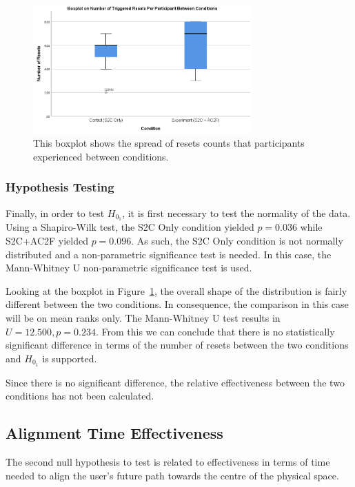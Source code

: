 \begin{figure}[tbph]
    \centering
    \includegraphics[width=0.75\textwidth]{figures/graphs/resetCountBoxPlot.png}
    \caption[Boxplot of Number of Resets Per Participant Between Conditions for Experiment 2]{This boxplot shows the spread of resets counts that participants experienced between conditions.}
    \label{fig:ex2resetboxplot}
\end{figure}

\subsubsection{Hypothesis Testing}
Finally, in order to test $H_{0_1}$, it is first necessary to test the normality of the data. Using a Shapiro-Wilk test, the S2C Only condition yielded $p = 0.036$ while S2C+AC2F yielded $p = 0.096$. As such, the S2C Only condition is not normally distributed and a non-parametric significance test is needed. In this case, the Mann-Whitney U non-parametric significance test is used. 

Looking at the boxplot in Figure~\ref{fig:ex2resetboxplot}, the overall shape of the distribution is fairly different between the two conditions. In consequence, the comparison in this case will be on mean ranks only. The Mann-Whitney U test results in $U = 12.500, p = 0.234$. From this we can conclude that there is no statistically significant difference in terms of the number of resets between the two conditions and $H_{0_1}$ is supported.

Since there is no significant difference, the relative effectiveness between the two conditions has not been calculated.

\subsection{Alignment Time Effectiveness}
The second null hypothesis to test is related to effectiveness in terms of time needed to align the user's future path towards the centre of the physical space. 

